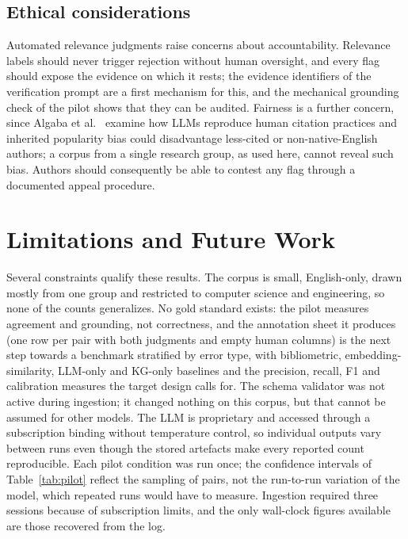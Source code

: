 \documentclass[lettersize,journal]{IEEEtran}
\begin{document}
\subsection{Ethical considerations}

Automated relevance judgments raise concerns about accountability. Relevance labels should never trigger rejection without human oversight, and every flag should expose the evidence on which it rests; the evidence identifiers of the verification prompt are a first mechanism for this, and the mechanical grounding check of the pilot shows that they can be audited. Fairness is a further concern, since Algaba et al.~\cite{algaba2026how} examine how LLMs reproduce human citation practices and inherited popularity bias could disadvantage less-cited or non-native-English authors; a corpus from a single research group, as used here, cannot reveal such bias. Authors should consequently be able to contest any flag through a documented appeal procedure.

\section{Limitations and Future Work}
\label{sec:limitations}

Several constraints qualify these results. The corpus is small, English-only, drawn mostly from one group and restricted to computer science and engineering, so none of the counts generalizes. No gold standard exists: the pilot measures agreement and grounding, not correctness, and the annotation sheet it produces (one row per pair with both judgments and empty human columns) is the next step towards a benchmark stratified by error type, with bibliometric, embedding-similarity, LLM-only and KG-only baselines and the precision, recall, F1 and calibration measures the target design calls for. The schema validator was not active during ingestion; it changed nothing on this corpus, but that cannot be assumed for other models. The LLM is proprietary and accessed through a subscription binding without temperature control, so individual outputs vary between runs even though the stored artefacts make every reported count reproducible. Each pilot condition was run once; the confidence intervals of Table~\ref{tab:pilot} reflect the sampling of pairs, not the run-to-run variation of the model, which repeated runs would have to measure. Ingestion required three sessions because of subscription limits, and the only wall-clock figures available are those recovered from the log.
\end{document}
